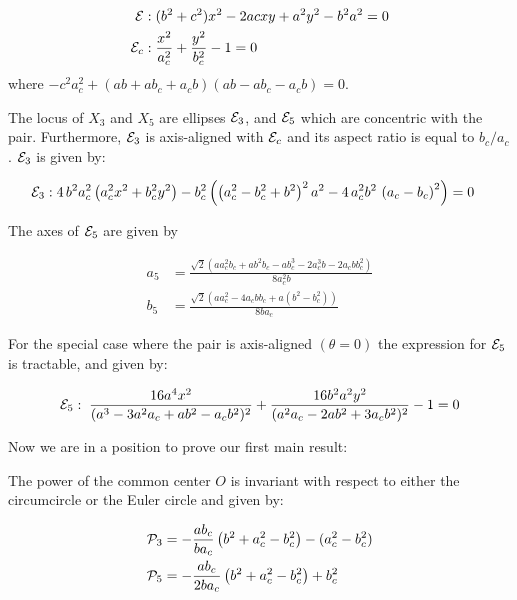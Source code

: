 \begin{align*}
   \E&:  (b^2 + c^2)x^2  - 2 a c x y  + a^2 y^2 - b^2 a^2=0 \\
   \E_c&: \frac{x^2}{a_c^2}+\frac{y^2}{b_c^2}-1=0\\
\end{align*} 
where $-c^2a_c^2 + (ab + a b_c + a_c b)(ab - ab_c - a_c b)=0$.

\begin{proposition}
The locus of $X_3$ and $X_5$ are ellipses $\E_3$, and $\E_5$  which are concentric with the pair. Furthermore, $\E_3$ is axis-aligned with $\E_c$ and its aspect ratio is equal to $b_c/a_c$. $\E_3$ is given by:

\begin{align*}
%
\E_3:&\; 4\,{b}^{2}a_c^{2} \left( a_c^{2}{x}^{2}+b_c^{2}{y}^{2} \right)  
 -b_c^{2} \left(  \left( a_c^{2}-
b_c^{2} +{b}^{2}\right)^2 a^2 -4\,a_c^2b^2\, \left( a_c-b_c
 \right)^2   \right)    =0
\end{align*}
\label{prop:loci-x3-x5}

\noindent The axes of $\E_5$ are given by

\begin{align*}
    a_5&=\frac{\sqrt{2} (a a_c^2 b_c + a b^2 b_c - a b_c^3 - 2 a_c^3 b - 2 a_c b b_c^2)}{8 a_c^2 b}\\
    b_5&=\frac{\sqrt{2} (a a_c^2 - 4 a_c b b_c + a (b^2 - b_c^2))}{8 b a_c}
\end{align*} 
\end{proposition}

\begin{observation}
For the special case where the pair is axis-aligned $(\theta=0)$ the expression for $\E_5$ is tractable, and given by:

\[\E_5: \; \frac{ 16 a^4x^2}{(a^3 - 3 a^2  a_c + a b^2 -  a_c b^2)^2}+\frac{16 b^2 a^2y^2}{ (a^2  a_c - 2 a b^2 + 3  a_c b^2)^2}-1=0\]
\end{observation}

Now we are in a position to prove our first main result:

\begin{theorem}
The power of the common center $O$ is invariant with respect to either the circumcircle or the Euler circle and given by:

\begin{align*}
    \P_3  &=-\frac{a b_c}{b a_c}\left(b^2 + a_c^2 - b_c^2 \right)- (a_c^2 - b_c^2) \\
    \P_5&= -\frac{a b_c}{2 b a_c}\left(b^2 + a_c^2 - b_c^2 \right)+b_c^{2}
\end{align*}

\label{thm:power-concentric-unaligned}
\end{theorem}

